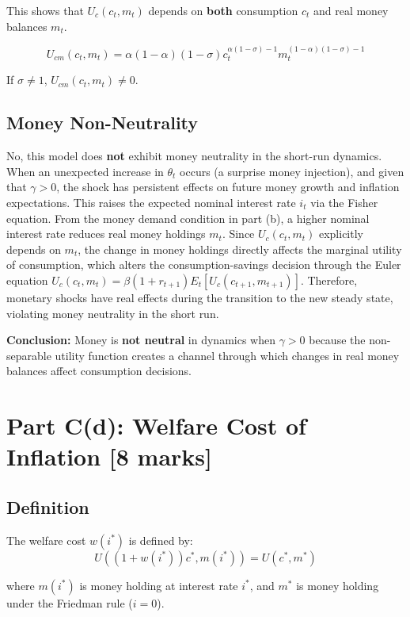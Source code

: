 This shows that $U_c(c_t, m_t)$ depends on \textbf{both} consumption $c_t$ and real money balances $m_t$.

\begin{equation}
U_{cm}(c_t, m_t) = \alpha (1-\alpha)(1-\sigma)c_t^{\alpha(1-\sigma)-1} m_t^{(1-\alpha)(1-\sigma)-1}
\end{equation}

If $\sigma\neq1$, $U_{cm}(c_t, m_t) \neq0$. 

\subsection*{Money Non-Neutrality}
No, this model does \textbf{not} exhibit money neutrality in the short-run dynamics. When an unexpected increase in $\theta_t$ occurs (a surprise money injection), and given that $\gamma > 0$, the shock has persistent effects on future money growth and inflation expectations. This raises the expected nominal interest rate $i_t$ via the Fisher equation. From the money demand condition in part (b), a higher nominal interest rate reduces real money holdings $m_t$. Since $U_c(c_t, m_t)$ explicitly depends on $m_t$, the change in money holdings directly affects the marginal utility of consumption, which alters the consumption-savings decision through the Euler equation $U_c(c_t, m_t) = \beta(1+r_{t+1})E_t[U_c(c_{t+1}, m_{t+1})]$. Therefore, monetary shocks have real effects during the transition to the new steady state, violating money neutrality in the short run.

\textbf{Conclusion:} Money is \textbf{not neutral} in dynamics when $\gamma > 0$ because the non-separable utility function creates a channel through which changes in real money balances affect consumption decisions.

\section*{Part C(d): Welfare Cost of Inflation [8 marks]}

\subsection*{Definition}
The welfare cost $w(i^*)$ is defined by:
\begin{equation}
U((1+w(i^*))c^*, m(i^*)) = U(c^*, m^*)
\end{equation}

where $m(i^*)$ is money holding at interest rate $i^*$, and $m^*$ is money holding under the Friedman rule ($i=0$).

